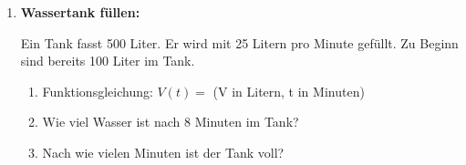 \begin{enumerate}[label=\arabic*.,resume]
\begin{enumerate}[label=\alph*)]
    \end{enumerate}

    \item \textbf{Wassertank füllen:}

    Ein Tank fasst 500 Liter. Er wird mit 25 Litern pro Minute gefüllt. Zu Beginn sind bereits 100 Liter im Tank.

    \begin{enumerate}[label=\alph*)]
        \item Funktionsgleichung: $V(t) = $ \underline{\hspace{6cm}} (V in Litern, t in Minuten)

        \item Wie viel Wasser ist nach 8 Minuten im Tank?

        \vspace{1.5cm}

        \item Nach wie vielen Minuten ist der Tank voll?

        \vspace{2cm}

    \end{enumerate}

\end{enumerate}